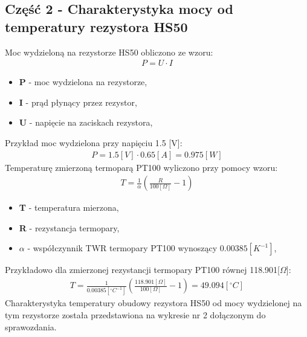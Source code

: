 \documentclass[11pt]{article}
\begin{document}
    \subsection*{Część 2 - Charakterystyka mocy od temperatury rezystora HS50}
   \noindent Moc wydzieloną na rezystorze HS50 obliczono ze wzoru:
    \begin{gather*}
        P=U\cdot I
    \end{gather*}
    {\footnotesize
        \begin{itemize}
            \setlength\itemsep{0em}
            \item[] \textbf{P} - moc wydzielona na rezystorze,
            \item[] \textbf{I} - prąd płynący przez rezystor,
            \item[] \textbf{U} - napięcie na zaciskach rezystora,
        \end{itemize}}
    \noindent Przykład moc wydzielona przy napięciu 1.5 [V]:
    \begin{gather*}
        P=1.5 [V]\cdot 0.65 [A]=0.975 [W]
    \end{gather*}
    \noindent Temperaturę zmierzoną termoparą PT100 wyliczono przy pomocy wzoru:
    \begin{gather*}
        T=\frac{1}{\alpha}(\frac{R}{100[\Omega]}-1)
    \end{gather*}
    {\footnotesize
        \begin{itemize}
            \setlength\itemsep{0em}
            \item[] \textbf{T} - temperatura mierzona,
            \item[] \textbf{R} - rezystancja termopary,
            \item[] \textbf{$\alpha$} - współczynnik TWR termopary PT100 wynoszący $0.00385[K^{-1}]$,
        \end{itemize}}
    \noindent Przykładowo dla zmierzonej rezystancji termopary PT100 równej 118.901[$\Omega$]:
    \begin{gather*}
        T=\frac{1}{0.00385[{^\circ}C^{-1}]}(\frac{118.901[\Omega]}{100[\Omega]}-1)=49.094[{^\circ}C]
    \end{gather*}
    Charakterystyka temperatury obudowy rezystora HS50 od mocy wydzielonej na tym rezystorze została przedstawiona na wykresie nr 2 dołączonym do sprawozdania.
    \newpage
\end{document}
